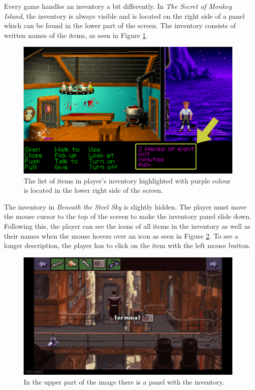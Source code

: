 Every game handles an inventory a bit differently. In \textit{The Secret of Monkey Island}, the inventory is always visible and is located on the right side of a panel which can be found in the lower part of the screen. The inventory consists of written names of the items, as seen in Figure \ref{fig:I-TSoMI}.
\begin{figure}[H]
\centering
\includegraphics[width=.8\linewidth]{img/I-TSoMI.png}
\caption{The list of items in player's inventory highlighted with purple colour is located in the lower right side of the screen.}
\label{fig:I-TSoMI}
\end{figure}

The inventory in \textit{Beneath the Steel Sky} is slightly hidden. The player must move the mouse cursor to the top of the screen to make the inventory panel slide down. Following this, the player can see the icons of all items in the inventory as well as their names when the mouse hovers over an icon as seen in Figure \ref{fig:I-BaSS}. To see a longer description, the player has to click on the item with the left mouse button.
\begin{figure}[H]
\centering
\includegraphics[width=1.\linewidth]{img/BaSS.png}
\caption{In the upper part of the image there is a panel with the inventory.}
\label{fig:I-BaSS}
\end{figure}

